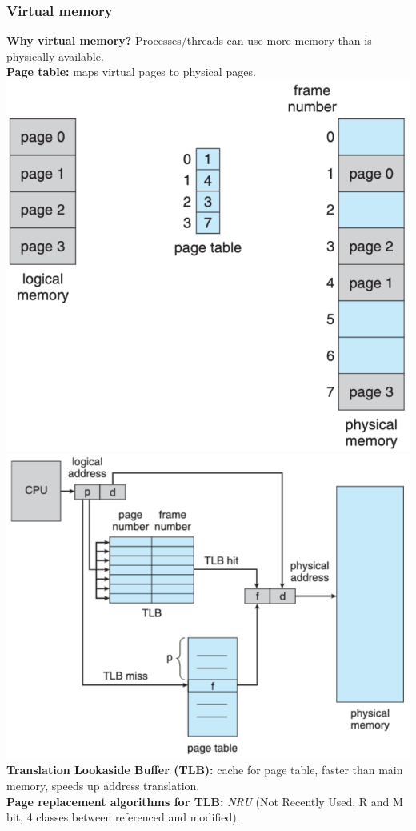 \subsubsection{Virtual memory}
\textbf{Why virtual memory?} Processes/threads can use more memory than is physically available.\\
\textbf{Page table:} maps virtual pages to physical pages.\\
\includegraphics[width=0.4\linewidth]{figs/paging-model.png}
\includegraphics[width=0.45\linewidth]{figs/mmu-with-tlb.png}\\
\textbf{Translation Lookaside Buffer (TLB):} cache for page table, faster than main memory, speeds up address translation.\\
\textbf{Page replacement algorithms for TLB:} \textit{NRU} (Not Recently Used, R and M bit, 4 classes between referenced and modified).\\
